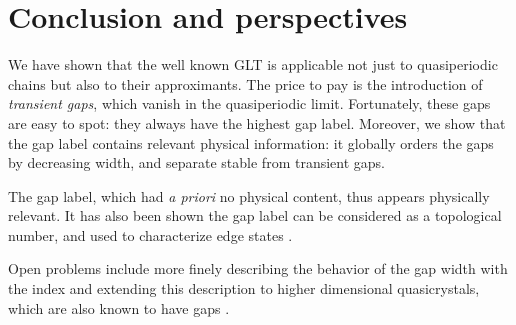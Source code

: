 \documentclass[a4paper]{jpconf}
\begin{document}
\section*{Conclusion and perspectives}

We have shown that the well known GLT is applicable not just to quasiperiodic chains but also to their approximants.
The price to pay is the introduction of \emph{transient gaps}, which vanish in the quasiperiodic limit. 
Fortunately, these gaps are easy to spot: they always have the highest gap label.
Moreover, we show that the gap label contains relevant physical information: it globally orders the gaps by decreasing width, and separate stable from transient gaps.

The gap label, which had \emph{a priori} no physical content, thus appears physically relevant.
It has also been shown the gap label can be considered as a topological number, and used to characterize edge states \cite{Levy2015}.

Open problems include more finely describing the behavior of the gap width with the index and extending this description to higher dimensional quasicrystals, which are also known to have gaps \cite{Zijlstra, penrosegaps}.

\begin{fullwidth}
\bibhang=50pt
\printbibliography
\end{fullwidth}
\end{document}
